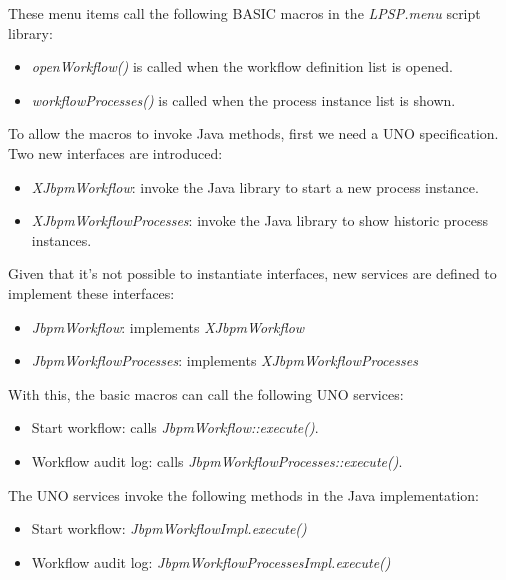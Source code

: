 
These menu items call the following BASIC macros in the \emph{LPSP.menu} script library:

\begin{itemize}
\item \emph{openWorkflow()} is called when the workflow definition list is opened.
\item \emph{workflowProcesses()} is called when the process instance list is shown.
\end{itemize}


To allow the macros to invoke Java methods, first we need a UNO specification.
Two new interfaces are introduced:

\begin{itemize}
\item \emph{XJbpmWorkflow}: invoke the Java library to start a new process instance.
\item \emph{XJbpmWorkflowProcesses}: invoke the Java library to show historic process instances.
\end{itemize}

Given that it's not possible to instantiate interfaces, new services are
defined to implement these interfaces:

\begin{itemize}
\item \emph{JbpmWorkflow}: implements \emph{XJbpmWorkflow}
\item \emph{JbpmWorkflowProcesses}: implements \emph{XJbpmWorkflowProcesses}
\end{itemize}

With this, the basic macros can call the following UNO services:

\begin{itemize}
\item Start workflow: calls \emph{JbpmWorkflow::execute()}.
\item Workflow audit log: calls \emph{JbpmWorkflowProcesses::execute()}.
\end{itemize}


The UNO services invoke the following methods in the Java implementation:

\begin{itemize}
\item Start workflow: \emph{JbpmWorkflowImpl.execute()}
\item Workflow audit log: \emph{JbpmWorkflowProcessesImpl.execute()}
\end{itemize}

